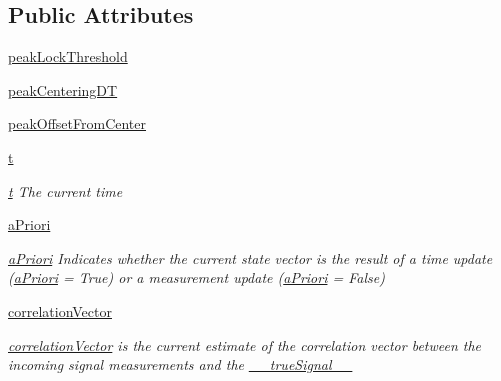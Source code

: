 \subsection*{Public Attributes}
\begin{DoxyCompactItemize}
\item 
\hyperlink{classmodest_1_1substates_1_1correlationvector_1_1CorrelationVector_a4ed000a24616aee1eb5bf4c323850cb5}{peak\+Lock\+Threshold}
\item 
\hyperlink{classmodest_1_1substates_1_1correlationvector_1_1CorrelationVector_ae9ff77b4328fa9f8d258264e7489457d}{peak\+Centering\+DT}
\item 
\hyperlink{classmodest_1_1substates_1_1correlationvector_1_1CorrelationVector_af86c37daca62547d1b91cf015893a638}{peak\+Offset\+From\+Center}
\item 
\hyperlink{classmodest_1_1substates_1_1correlationvector_1_1CorrelationVector_a127ca6c8eed6a2e822dbac7e83458bf3}{t}
\begin{DoxyCompactList}\small\item\em \hyperlink{classmodest_1_1substates_1_1correlationvector_1_1CorrelationVector_a127ca6c8eed6a2e822dbac7e83458bf3}{t} The current time \end{DoxyCompactList}\item 
\hyperlink{classmodest_1_1substates_1_1correlationvector_1_1CorrelationVector_a9af2ca612576e52c84e98757e53085a8}{a\+Priori}
\begin{DoxyCompactList}\small\item\em \hyperlink{classmodest_1_1substates_1_1correlationvector_1_1CorrelationVector_a9af2ca612576e52c84e98757e53085a8}{a\+Priori} Indicates whether the current state vector is the result of a time update (\hyperlink{classmodest_1_1substates_1_1correlationvector_1_1CorrelationVector_a9af2ca612576e52c84e98757e53085a8}{a\+Priori} = True) or a measurement update (\hyperlink{classmodest_1_1substates_1_1correlationvector_1_1CorrelationVector_a9af2ca612576e52c84e98757e53085a8}{a\+Priori} = False) \end{DoxyCompactList}\item 
\hyperlink{classmodest_1_1substates_1_1correlationvector_1_1CorrelationVector_a81da583ee9077067b6aaa354fd8a8c49}{correlation\+Vector}
\begin{DoxyCompactList}\small\item\em \hyperlink{classmodest_1_1substates_1_1correlationvector_1_1CorrelationVector_a81da583ee9077067b6aaa354fd8a8c49}{correlation\+Vector} is the current estimate of the correlation vector between the incoming signal measurements and the \hyperlink{classmodest_1_1substates_1_1correlationvector_1_1CorrelationVector_af2f52cea1c695f36dd100f529c322e94}{\+\_\+\+\_\+true\+Signal\+\_\+\+\_\+} \end{DoxyCompactList}\item 

\end{DoxyCompactItemize}
